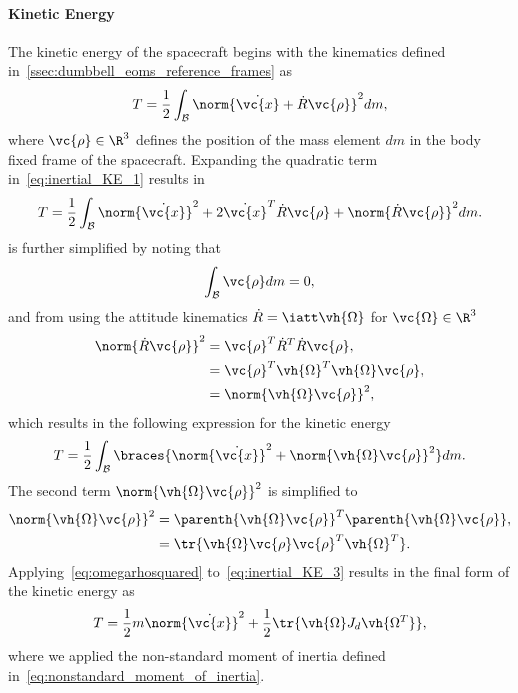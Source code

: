 \paragraph{Kinetic Energy}\label{sec:inertial_kinetic_energy}
The kinetic energy of the spacecraft begins with the kinematics defined in~\cref{ssec:dumbbell_eoms_reference_frames} as
\begin{align}\label{eq:inertial_KE_1}
    T = \frac{1}{2} \int_{\mathcal{B}} \norm{ \dot{\vc{x}} + \dot{R} \vc{\rho}}^2 dm,
\end{align}
where \( \vc{\rho} \in \R^3 \) defines the position of the mass element \( dm \) in the body fixed frame of the spacecraft.
Expanding the quadratic term in~\cref{eq:inertial_KE_1} results in
\begin{align}\label{eq:inertial_KE_2}
T = \frac{1}{2} \int_{\mathcal{B}}  \norm{\dot{\vc{x}}}^2 + 2 \dot{\vc{x}}^T \dot{R} \vc{\rho} + \norm{\dot{R} \vc{\rho} }^2    dm .
\end{align}
 is further simplified by noting that
\begin{align*}
    \int_{\mathcal{B}} \vc{\rho} dm = 0,
\end{align*}
and from using the attitude kinematics \( \dot{R} = \iatt \vh{\Omega} \) for \( \vc{\Omega} \in \R^3 \) 
\begin{align*}
    \norm{\dot{R} \vc{\rho} }^2 &= \vc{\rho}^T\dot{R}^T \dot{R} \vc{\rho} , \\
                                &=  \vc{\rho}^T \vh{\Omega}^T \vh{\Omega} \vc{\rho} , \\
                                &= \norm{ \vh{\Omega} \vc{\rho} }^2, 
\end{align*}
which results in the following expression for the kinetic energy
\begin{align}\label{eq:inertial_KE_3}
    T = \frac{1}{2} \int_{\mathcal{B}} \braces{ \norm{\dot{\vc{x}}}^2 + \norm{\vh{\Omega} \vc{\rho}}^2 } dm.
\end{align}
The second term \( \norm{\vh{\Omega}\vc{\rho}}^2 \) is simplified to
\begin{align}
    \norm{ \vh{\Omega}\vc{\rho} }^2 &= \parenth{ \vh{\Omega}\vc{\rho}}^T \parenth{\vh{\Omega}\vc{\rho}} , \nonumber\\
                                    &= \tr{ \vh{\Omega} \vc{\rho} \vc{\rho}^T \vh{\Omega}^T }.\label{eq:omegarhosquared}
\end{align}
Applying~\cref{eq:omegarhosquared} to~\cref{eq:inertial_KE_3} results in the final form of the kinetic energy as
\begin{align}\label{eq:inertial_kinetic_energy}
    T = \frac{1}{2} m \norm{\dot{\vc{x}}}^2 + \frac{1}{2} \tr{ \vh{\Omega}J_d \vh{\Omega^T } }, 
\end{align}
where we applied the non-standard moment of inertia defined in~\cref{eq:nonstandard_moment_of_inertia}.


